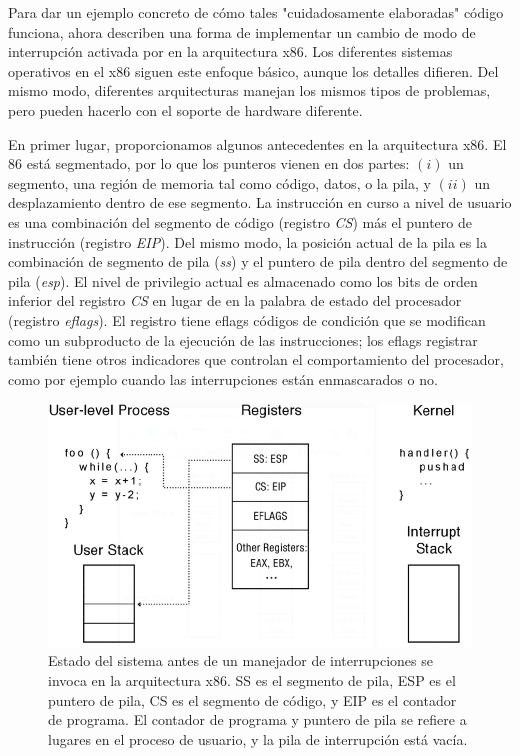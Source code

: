 \documentclass[10pt]{book}
\begin{document}
Para dar un ejemplo concreto de cómo tales "cuidadosamente elaboradas" código funciona, ahora describen una forma de implementar un cambio de modo de interrupción activada por en la arquitectura x86. Los diferentes sistemas operativos en el x86 siguen este enfoque básico, aunque los detalles difieren. Del mismo modo, diferentes arquitecturas manejan los mismos tipos de problemas, pero pueden hacerlo con el soporte de hardware diferente.

En primer lugar, proporcionamos algunos antecedentes en la arquitectura x$86$. El $86$ está segmentado, por lo que los punteros vienen en dos partes: $(i)$ un segmento, una región de memoria tal como código, datos, o la pila, y $(ii)$ un desplazamiento dentro de ese segmento. La instrucción en curso a nivel de usuario es una combinación del segmento de código (registro \textit{CS}) más el puntero de instrucción (registro \textit{EIP}). Del mismo modo, la posición actual de la pila es la combinación de segmento de pila (\textit{ss}) y el puntero de pila dentro del segmento de pila (\textit{esp}). El nivel de privilegio actual es almacenado como los bits de orden inferior del registro \textit{CS} en lugar de en la palabra de estado del procesador (registro \textit{eflags}). El registro tiene eflags códigos de condición que se modifican como un subproducto de la ejecución de las instrucciones; los eflags registrar también tiene otros indicadores que controlan el comportamiento del procesador, como por ejemplo cuando las interrupciones están enmascarados o no.

\begin{figure}[tbhp]
\centerline{\includegraphics[scale=0.55]{img/fig0206}}
\caption{Estado del sistema antes de un manejador de interrupciones se invoca en la arquitectura x86. SS es el segmento de pila, ESP es el puntero de pila, CS es el segmento de código, y EIP es el contador de programa. El contador de programa y puntero de pila se refiere a lugares en el proceso de usuario, y la pila de interrupción está vacía.}
\label{fig0206}
\end{figure}
\end{document}
